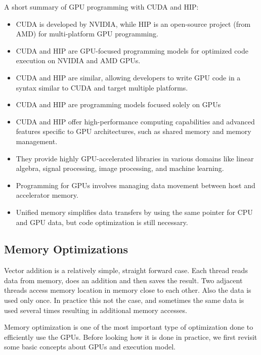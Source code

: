 \par
A short summary of GPU programming with CUDA and HIP:
\begin{itemize}
    \item CUDA is developed by NVIDIA, while HIP is an open-source project (from AMD) for multi-platform GPU programming.
    \item CUDA and HIP are GPU-focused programming models for optimized code execution on NVIDIA and AMD GPUs.
    \item CUDA and HIP are similar, allowing developers to write GPU code in a syntax similar to CUDA and target multiple platforms.
    \item CUDA and HIP are programming models focused solely on GPUs
    \item CUDA and HIP offer high-performance computing capabilities and advanced features specific to GPU architectures, such as shared memory and memory management.
    \item They provide highly GPU-accelerated libraries in various domains like linear algebra, signal processing, image processing, and machine learning.
    \item Programming for GPUs involves managing data movement between host and accelerator memory.
    \item Unified memory simplifies data transfers by using the same pointer for CPU and GPU data, but code optimization is still necessary.
\end{itemize}




\subsection{Memory Optimizations}\label{sec:memory_optimization}


\par
Vector addition is a relatively simple, straight forward case.
Each thread reads data from memory, does an addition and then saves the result. 
Two adjacent threads access memory location in memory close to each other.
Also the data is used only once.
In practice this not the case, and sometimes the same data is used several times resulting in additional memory accesses.


\par
Memory optimization is one of the most important type of optimization done to efficiently use the GPUs.
Before looking how it is done in practice, we first revisit some basic concepts about GPUs and execution model.



